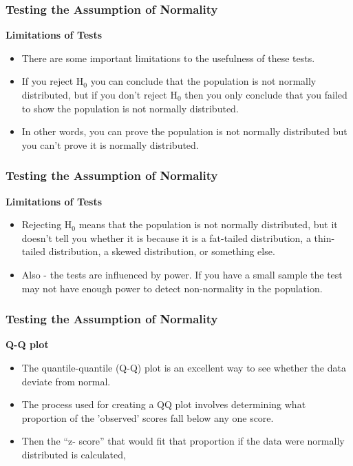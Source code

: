 \documentclass{beamer}
\begin{document}
	\begin{frame}
		\frametitle{Testing the Assumption of Normality}
		\Large	
	
	
		 
		\textbf{Limitations of Tests}
		\begin{itemize}
		\item	There are some important limitations to the usefulness of these tests. 
		\item	If you reject H$_0$ you can conclude that the population is not normally distributed, but if you don't reject H$_0$ then you only conclude that you failed to show the population is not normally distributed. 
		\item	In other words, you can prove the population is not normally distributed but you can't prove it is normally distributed. 
			\end{itemize}
		\end{frame}
		\begin{frame}
			\frametitle{Testing the Assumption of Normality}
			\Large		
			\textbf{Limitations of Tests}
			\begin{itemize}	
					\item	Rejecting H$_0$ means that the population is not normally distributed, but it doesn't tell you whether it is because it is a fat-tailed distribution, a thin-tailed distribution, a skewed distribution, or something else.
		\item	Also - the tests are influenced by power. If you have a small sample the test may not have enough power to detect non-normality in the population.
		\end{itemize}
	\end{frame}
	\begin{frame}
		\frametitle{Testing the Assumption of Normality}
		\Large		
	\textbf{Q-Q plot}
	\begin{itemize}	
	\item	The quantile-quantile (Q-Q) plot is an excellent way to see whether the data deviate from normal.
	\item	The process used for creating a QQ plot involves determining what proportion of the 'observed' scores fall below any one score. 
	\item	Then the “z- score” that would fit that proportion if the data were normally distributed is calculated,
			\end{itemize}
		\end{frame}
\end{document}
